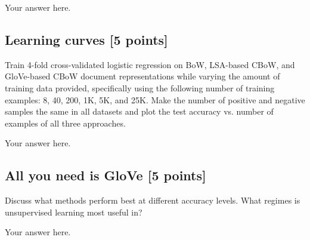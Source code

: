 \documentclass[a4paper]{article}
\theoremstyle{definition}
\begin{document}
{\color{blue}
	Your answer here.
}

\subsection{Learning curves [5 points]}\label{sec:curves}

Train 4-fold cross-validated logistic regression on BoW, LSA-based CBoW, and GloVe-based CBoW document representations while varying the amount of training data provided, specifically using the following number of training examples: 8, 40, 200, 1K, 5K, and 25K.
Make the number of positive and negative samples the same in all datasets and plot the test accuracy vs. number of examples of all three approaches.

{\color{blue}
	Your answer here.
}

\subsection{All you need is GloVe [5 points]}

Discuss what methods perform best at different accuracy levels.
What regimes is unsupervised learning most useful in?

{\color{blue}
	Your answer here.
}
\end{document}
